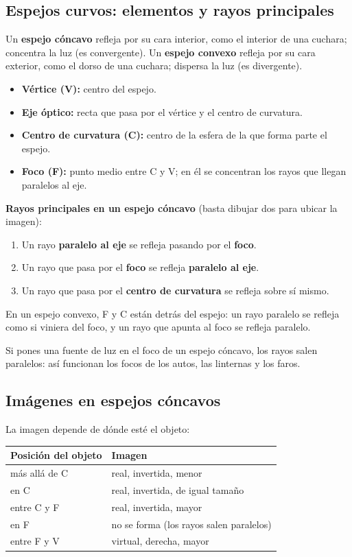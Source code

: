 \subsection{Espejos curvos: elementos y rayos principales}
Un \textbf{espejo cóncavo} refleja por su cara interior, como el interior de una cuchara; concentra la luz (es convergente). Un \textbf{espejo convexo} refleja por su cara exterior, como el dorso de una cuchara; dispersa la luz (es divergente).

 
\begin{itemize}
  \item \textbf{Vértice (V):} centro del espejo.
  \item \textbf{Eje óptico:} recta que pasa por el vértice y el centro de curvatura.
  \item \textbf{Centro de curvatura (C):} centro de la esfera de la que forma parte el espejo.
  \item \textbf{Foco (F):} punto medio entre C y V; en él se concentran los rayos que llegan paralelos al eje.
\end{itemize}
  

\textbf{Rayos principales en un espejo cóncavo} (basta dibujar dos para ubicar la imagen):

 
\begin{enumerate}
  \item Un rayo \textbf{paralelo al eje} se refleja pasando por el \textbf{foco}.
  \item Un rayo que pasa por el \textbf{foco} se refleja \textbf{paralelo al eje}.
  \item Un rayo que pasa por el \textbf{centro de curvatura} se refleja sobre sí mismo.
\end{enumerate}
 

En un espejo convexo, F y C están detrás del espejo: un rayo paralelo se refleja como si viniera del foco, y un rayo que apunta al foco se refleja paralelo.

 
\begin{clave}[{Recuerda}] Si pones una fuente de luz en el foco de un espejo cóncavo, los rayos salen paralelos: así funcionan los focos de los autos, las linternas y los faros.\end{clave}
\subsection{Imágenes en espejos cóncavos}
La imagen depende de dónde esté el objeto:

 
\begin{center}\small
\begin{tabular}{@{}ll@{}}
\toprule
\textbf{Posición del objeto} & \textbf{Imagen} \\
\midrule
más allá de C & real, invertida, menor \\
en C & real, invertida, de igual tamaño \\
entre C y F & real, invertida, mayor \\
en F & no se forma (los rayos salen paralelos) \\
entre F y V & virtual, derecha, mayor \\
\bottomrule
\end{tabular}
\end{center}
 

